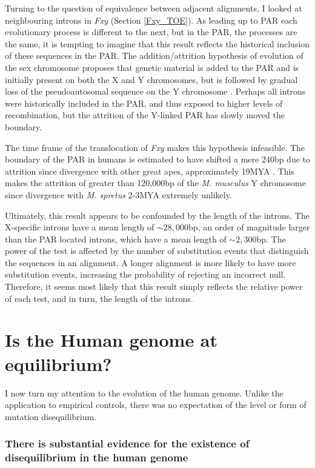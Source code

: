 Turning to the question of equivalence between adjacent alignments, I looked at neighbouring introns in \textit{Fxy} (Section \ref{Fxy_TOE}). As leading up to PAR each evolutionary process is different to the next, but in the PAR, the processes are the same, it is tempting to imagine that this result reflects the historical inclusion of these sequences in the PAR. The addition/attrition hypothesis of evolution of the sex chromosome proposes that genetic material is added to the PAR and is initially present on both the X and Y chromosomes, but is followed by gradual loss of the pseudoautosomal sequence on the Y chromosome  \citep{Graves1995TheGenes}. Perhaps all introns were historically included in the PAR, and thus exposed to higher levels of recombination, but the \gls{attrition} of the Y-linked PAR has slowly moved the boundary. 

The time frame of the translocation of \textit{Fxy} makes this hypothesis infeasible. The boundary of the PAR in humans is estimated to have shifted a mere 240bp due to attrition since divergence with other great apes, approximately 19\acrshort{MYA} \citep{Mensah2014PseudoautosomalPopulation}. This makes the attrition of greater than 120,000bp of the \textit{M. musculus} Y chromosome since divergence with \textit{M. spretus} 2-3MYA extremely unlikely. 

Ultimately, this result appears to be confounded by the length of the introns. The X-specific introns have a mean length of $\sim28,000$bp, an order of magnitude larger than the PAR located introns, which have a mean length of $\sim2,300$bp. The power of the test is affected by the number of substitution events that distinguish the sequences in an alignment. A longer alignment is more likely to have more substitution events, increasing the probability of rejecting an incorrect null. Therefore, it seems most likely that this result simply reflects the relative power of each test, and in turn, the length of the introns. 

\section{Is the Human genome at equilibrium?}

I now turn my attention to the evolution of the human genome. Unlike the application to empirical controls, there was no expectation of the level or form of mutation disequilibrium. 

\subsubsection{There is substantial evidence for the existence of disequilibrium in the human genome}

